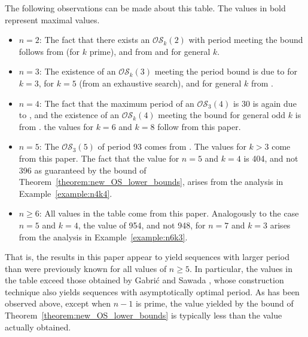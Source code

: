 \documentclass[a4paper,11pt]{article}
\theoremstyle{plain}
\theoremstyle{definition}
\theoremstyle{remark}
\begin{document}
The following observations can be made about this table.  The values in bold represent maximal
values.
\begin{itemize}
\item $n=2$:  The fact that there exists an $\mathcal{OS}_k(2)$ with period meeting the bound
    follows from \cite[Theorem 5.4]{Alhakim24a} (for $k$ prime), and from \cite[Theorem
    2]{Gabric25} and \cite[Lemma 2.2]{Mitchell25a} for general $k$.
\item $n=3$: The existence of an $\mathcal{OS}_k(3)$ meeting the period bound is due to
    \cite[Example 5.1]{Alhakim24a} for $k=3$, \cite[Section 1]{Gabric25} for $k=5$ (from an
    exhaustive search), and for general $k$ from \cite{Mitchell26}.
\item $n=4$: The fact that the maximum period of an $\mathcal{OS}_3(4)$ is 30 is again due to
    \cite[Section 1]{Gabric25}, and the existence of an $\mathcal{OS}_k(4)$ meeting the bound
    for general odd $k$ is from \cite{Mitchell26}. the values for $k=6$ and $k=8$ follow from
    this paper.
\item $n=5$: The $\mathcal{OS}_3(5)$ of period 93 comes from \cite{Mitchell26}. The values for
    $k>3$ come from this paper. The fact that the value for $n=5$ and $k=4$ is 404, and not 396
    as guaranteed by the bound of Theorem~\ref{theorem:new_OS_lower_bounds}, arises from the
    analysis in Example~\ref{example:n4k4}.
\item $n\geq6$: All values in the table come from this paper. Analogously to the case $n=5$ and
    $k=4$, the value of 954, and not 948, for $n=7$ and $k=3$ arises from the analysis in
    Example~\ref{example:n6k3}.
\end{itemize}

That is, the results in this paper appear to yield sequences with larger period than were
previously known for all values of $n\geq5$. In particular, the values in the table
exceed those obtained by Gabri\'{c} and Sawada \cite{Gabric25}, whose construction technique also
yields sequences with asymptotically optimal period. As has been observed above,
except when $n-1$ is prime, the value yielded by the bound of
Theorem~\ref{theorem:new_OS_lower_bounds} is typically less than the value actually obtained.
\end{document}
